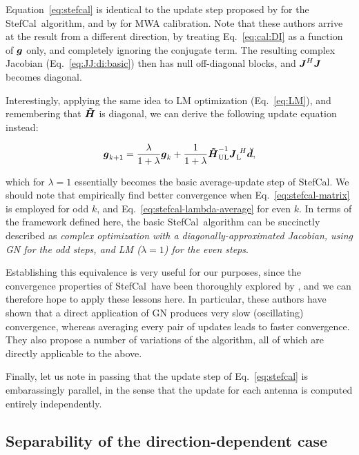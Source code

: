 \documentclass[useAMS,usenatbib]{mn2e}
\newcommand{\mat}[1]{{\bmath{#1}}}
\newcommand{\JJ}{\mat{J}} %
\newcommand{\HHa}{\mat{\tilde{H}}} %
\newcommand{\AUG}[1]{\bmath{\breve{#1}}}
\newcommand{\Dd}{\AUG{d}}
\newcommand{\LEFT}{\mathrm{L}}
\newcommand{\UL}{\mathrm{UL}}%
\newcommand{\StefCal}{{\sc StefCal}}
\begin{document}
Equation~\ref{eq:stefcal} 
is identical to the update step proposed by \citet{Stefcal} for the \StefCal\ algorithm, and by \citet{Mitchell-RTS} for MWA calibration. Note that these authors arrive at the result from a different 
direction, by treating Eq.~\ref{eq:cal:DI} as a function of $\bmath{g}$ only, and completely ignoring the conjugate term. 
The resulting complex Jacobian (Eq.~\ref{eq:JJ:di:basic}) then has null off-diagonal blocks, and $\JJ^H\JJ$ becomes 
diagonal.

Interestingly, applying the same idea to LM optimization (Eq.~\ref{eq:LM}), and remembering that $\HHa$ is 
diagonal, we can derive the following update equation instead:

\begin{equation}
\bmath{g}_{k+1} = \frac{\lambda}{1+\lambda}\bmath{g}_k + \frac{1}{1+\lambda} \HHa_{\UL}^{-1} \JJ_\LEFT^{~H} \Dd,
\label{eq:stefcal-lambda-average}
\end{equation}

which for $\lambda=1$ essentially becomes the basic average-update step of \StefCal. We should note that \citet{Stefcal}
empirically find better convergence when Eq.~\ref{eq:stefcal-matrix} is employed for odd $k$, and 
Eq.~\ref{eq:stefcal-lambda-average} for even $k$. In terms of the framework defined here, the basic \StefCal\ algorithm 
can be succinctly described as {\em complex optimization with a 
diagonally-approximated Jacobian, using GN for the odd steps, and LM ($\lambda=1$) for the even steps}.

Establishing this equivalence is 
very useful for our purposes, since the convergence properties of \StefCal\ have been thoroughly explored 
by \citet{Stefcal}, and we can therefore hope to apply these lessons here. In particular, these authors have shown 
that a direct application of GN produces very slow (oscillating) convergence, whereas averaging every pair of 
updates leads to faster convergence. They also propose a number of variations of the algorithm, all of which are 
directly applicable to the above.

Finally, let us note in passing that the update step of Eq.~\ref{eq:stefcal} is embarassingly parallel, in the sense 
that the update for each antenna is computed entirely independently.

\subsection{Separability of the direction-dependent case}
\end{document}
